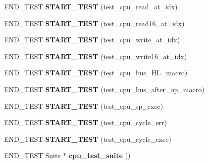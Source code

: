 \begin{DoxyCompactItemize}
E\+N\+D\+\_\+\+T\+E\+ST {\bfseries S\+T\+A\+R\+T\+\_\+\+T\+E\+ST} (test\+\_\+cpu\+\_\+read\+\_\+at\+\_\+idx)
\item 
\mbox{\label{unit-test-cpu_8c_af62d0cede898cb219804e73c6b9577f0}} 
E\+N\+D\+\_\+\+T\+E\+ST {\bfseries S\+T\+A\+R\+T\+\_\+\+T\+E\+ST} (test\+\_\+cpu\+\_\+read16\+\_\+at\+\_\+idx)
\item 
\mbox{\label{unit-test-cpu_8c_a8796dd3a2ba35f266c8f79f4baacc499}} 
E\+N\+D\+\_\+\+T\+E\+ST {\bfseries S\+T\+A\+R\+T\+\_\+\+T\+E\+ST} (test\+\_\+cpu\+\_\+write\+\_\+at\+\_\+idx)
\item 
\mbox{\label{unit-test-cpu_8c_a2073efc091ea804d0e1d41068e64a30e}} 
E\+N\+D\+\_\+\+T\+E\+ST {\bfseries S\+T\+A\+R\+T\+\_\+\+T\+E\+ST} (test\+\_\+cpu\+\_\+write16\+\_\+at\+\_\+idx)
\item 
\mbox{\label{unit-test-cpu_8c_adada909a27f9f2424d3a004968cd652d}} 
E\+N\+D\+\_\+\+T\+E\+ST {\bfseries S\+T\+A\+R\+T\+\_\+\+T\+E\+ST} (test\+\_\+cpu\+\_\+bus\+\_\+\+H\+L\+\_\+macro)
\item 
\mbox{\label{unit-test-cpu_8c_ac62fabd59104aa498ea44e849140d085}} 
E\+N\+D\+\_\+\+T\+E\+ST {\bfseries S\+T\+A\+R\+T\+\_\+\+T\+E\+ST} (test\+\_\+cpu\+\_\+bus\+\_\+after\+\_\+op\+\_\+macro)
\item 
\mbox{\label{unit-test-cpu_8c_ac0ba5cbaefbf88c9f2ff30db8836b0d5}} 
E\+N\+D\+\_\+\+T\+E\+ST {\bfseries S\+T\+A\+R\+T\+\_\+\+T\+E\+ST} (test\+\_\+cpu\+\_\+sp\+\_\+exec)
\item 
\mbox{\label{unit-test-cpu_8c_a75cd14b476ee128b6acb70489af3ee07}} 
E\+N\+D\+\_\+\+T\+E\+ST {\bfseries S\+T\+A\+R\+T\+\_\+\+T\+E\+ST} (test\+\_\+cpu\+\_\+cycle\+\_\+err)
\item 
\mbox{\label{unit-test-cpu_8c_a0ecb7e954458a2c08a91590c5b6381d6}} 
E\+N\+D\+\_\+\+T\+E\+ST {\bfseries S\+T\+A\+R\+T\+\_\+\+T\+E\+ST} (test\+\_\+cpu\+\_\+cycle\+\_\+exec)
\item 
\mbox{\label{unit-test-cpu_8c_a4c9cbb657fbc29519addb71dcc4928b8}} 
E\+N\+D\+\_\+\+T\+E\+ST Suite $\ast$ {\bfseries cpu\+\_\+test\+\_\+suite} ()
\end{DoxyCompactItemize}


